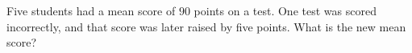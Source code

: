 Five students had a mean score of $90$ points on a test. One test was scored incorrectly, and that score was later raised by five points. What is the new mean score?
